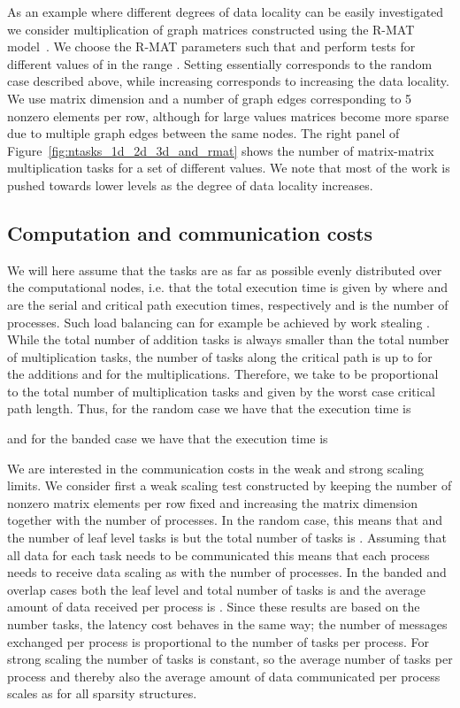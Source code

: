\documentclass{elsarticle}
\begin{document}
As an example where different degrees of data locality can be easily
investigated we consider multiplication of graph matrices constructed
using the R-MAT model~\cite{R-MAT}. We choose the R-MAT parameters
such that  and perform tests for different values
of  in the range . Setting  essentially
corresponds to the random case described above, while increasing 
corresponds to increasing the data locality.  We use matrix dimension
 and a number of graph edges corresponding to 5 nonzero
elements per row, although for large  values matrices become more
sparse due to multiple graph edges between the same nodes. The right
panel of Figure~\ref{fig:ntasks_1d_2d_3d_and_rmat} shows the number of
matrix-matrix multiplication tasks for a set of different  values.
We note that most of the work is pushed towards lower levels as the
degree of data locality increases.


\subsection{Computation and communication costs} \label{subsec:CompAndCommCosts}

We will here assume that the tasks are as far as possible evenly
distributed over the computational nodes, i.e. that the total
execution time is given by  where 
and  are the serial and critical path execution times,
respectively and  is the number of processes.  Such load balancing
can for example be achieved by work stealing
\cite{BlumofeAndLeiserson1999}.  
While the total number of addition tasks is always smaller than the
total number of multiplication tasks, the number of tasks along the
critical path is up to  for the additions
and  for the multiplications.  Therefore, we
take  to be proportional to the total number of multiplication
tasks and  given by the worst
case critical path length. Thus, for the random case we have that the
execution time is 
 
and for the banded case we have that the execution time is



We are interested in the communication costs in the weak and strong
scaling limits. We consider first a weak scaling test constructed by
keeping the number of nonzero matrix elements per row fixed and
increasing the matrix dimension together with the number of processes.
In the random case, this means that  and
the number of leaf level tasks is  but the total
number of tasks is . Assuming that all data
for each task needs to be communicated this means that each process
needs to receive data scaling as  with the
number of processes. In the banded and overlap cases both the leaf
level and total number of tasks is  and the average
amount of data received per process is . Since these
results are based on the number tasks, the latency cost behaves in the
same way; the number of messages exchanged per process is proportional
to the number of tasks per process.
For strong scaling the number of tasks is constant, so the average
number of tasks per process and thereby also the average amount of
data communicated per process scales as  for all
sparsity structures.
\end{document}
